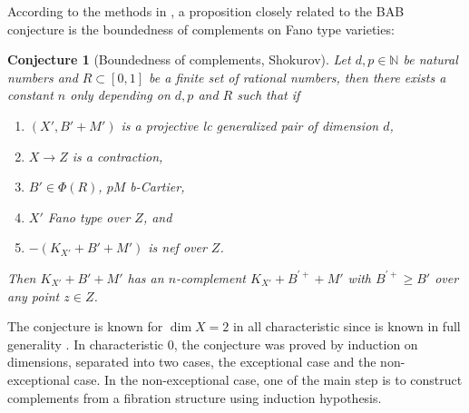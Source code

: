 \documentclass[letterpaper,reqno,12pt]{amsart}
\numberwithin{equation}{section}
\theoremstyle{plain}
\newtheorem{conjecture}[theorem]{Conjecture}
\begin{document}
According to the methods in  \cite{birkar2019antipluricanonicalsystemsfanovarieties}\cite{birkar2020singularitieslinearsystemsboundedness}, a proposition closely related to the BAB conjecture is the boundedness of complements on Fano type varieties:
\begin{conjecture}[Boundedness of complements, Shokurov]
\label{cplt}
    Let $d,p\in\mathbb N$ be natural numbers and $R\subset[0,1]$ be a finite set of rational numbers, then there exists a constant $n$ only depending on $d,p$ and $R$ such that if
    \begin{enumerate}
        \item $(X',B'+M')$ is a projective lc generalized pair of dimension $d$,
        \item $X\to Z$ is a contraction,
        \item $B'\in \Phi(R)$, $pM$ b-Cartier,
        \item $X'$ Fano type over $Z$, and
        \item $-(K_{X'}+B'+M')$ is nef over $Z$.
        
    \end{enumerate}Then $K_{X'}+B'+M'$ has an $n$-complement $K_{X'}+B^{\prime+} +M'$ with $B^{\prime+}\geq B'$ over any point $z\in Z$.
\end{conjecture} 

The conjecture is known for $\dim X=2$ in all characteristic since  is known in full generality \cite{boundednessandk2}. In characteristic $0$, the conjecture was proved by induction on dimensions, separated into two cases, the exceptional case and the non-exceptional case. In the non-exceptional case, one of the main step is to construct complements from a fibration structure using induction hypothesis. 
\end{document}
